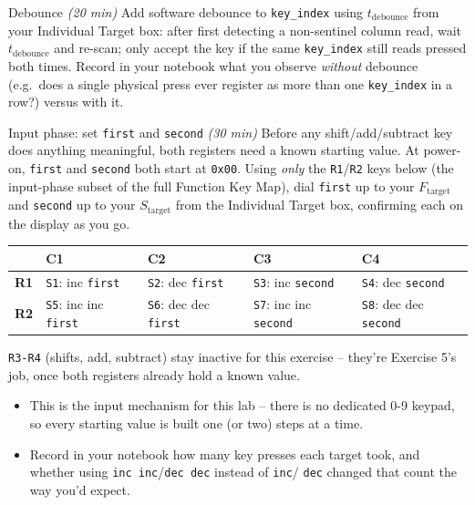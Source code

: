 \documentclass[11pt]{article}
\begin{document}
\begin{labexercise}{Debounce \hfill {\small \itshape (20 min)}}
Add software debounce to \texttt{key\_index} using $t_{\text{debounce}}$ from
your Individual Target box: after first detecting a non-sentinel column read,
wait $t_{\text{debounce}}$ and re-scan; only accept the key if the same
\texttt{key\_index} still reads pressed both times. Record in your notebook
what you observe \emph{without} debounce (e.g.\ does a single physical press
ever register as more than one \texttt{key\_index} in a row?) versus with it.
\end{labexercise}

\begin{labexercise}{Input phase: set \texttt{first} and \texttt{second} \hfill {\small \itshape (30 min)}}
Before any shift/add/subtract key does anything meaningful, both registers need a
known starting value. At power-on, \texttt{first} and \texttt{second} both start
at \texttt{0x00}. Using \emph{only} the \texttt{R1}/\texttt{R2} keys below (the
input-phase subset of the full Function Key Map), dial \texttt{first} up to your
$F_{\text{target}}$ and \texttt{second} up to your $S_{\text{target}}$ from the
Individual Target box, confirming each on the display as you go.
\begin{center}
\begin{tabular}{@{}c p{3.15cm} p{3.15cm} p{3.15cm} p{3.15cm}@{}}
\toprule
 & \textbf{C1} & \textbf{C2} & \textbf{C3} & \textbf{C4} \\
\midrule
\textbf{R1} &
{\color{accent}\texttt{S1}: inc \texttt{first}} &
{\color{accent}\texttt{S2}: dec \texttt{first}} &
{\color{ok!70!black}\texttt{S3}: inc \texttt{second}} &
{\color{ok!70!black}\texttt{S4}: dec \texttt{second}} \\
\textbf{R2} &
{\color{accent}\texttt{S5}: inc inc \texttt{first}} &
{\color{accent}\texttt{S6}: dec dec \texttt{first}} &
{\color{ok!70!black}\texttt{S7}: inc inc \texttt{second}} &
{\color{ok!70!black}\texttt{S8}: dec dec \texttt{second}} \\
\bottomrule
\end{tabular}
\end{center}
\texttt{R3-R4} (shifts, add, subtract) stay inactive for this exercise -- they're
Exercise 5's job, once both registers already hold a known value.
\begin{itemize}[nosep,leftmargin=*]
  \item This is the input mechanism for this lab -- there is no dedicated 0-9
        keypad, so every starting value is built one (or two) steps at a time.
  \item Record in your notebook how many key presses each target took, and
        whether using \texttt{inc inc}/\texttt{dec dec} instead of \texttt{inc}/
        \texttt{dec} changed that count the way you'd expect.
\end{itemize}
\end{labexercise}
\end{document}
